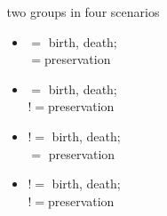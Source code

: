 \documentclass{beamer}
\begin{document}
\begin{frame}
\begin{columns}
\begin{column}{0.5\textwidth}
\begin{center}
        \tiny{}
      \end{center}
    \end{column}
    \begin{column}{0.5\textwidth}
      two groups in four scenarios
      \begin{itemize}
        \item \(=\) birth, death; \\\(=\)preservation
        \item \(=\) birth, death; \\\(!=\)preservation
        \item \(!=\) birth, death; \\\(=\) preservation
        \item \(!=\) birth, death; \\\(!=\)preservation
      \end{itemize}
    \end{column}
  \end{columns}
\end{frame}

\end{document}
